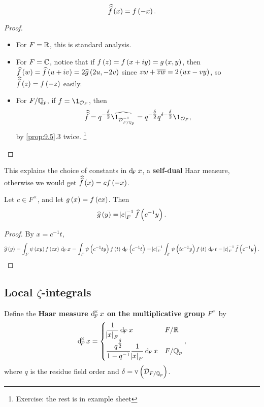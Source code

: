 \begin{proposition}
$$ \hathat{f}\br{x} = f\br{-x}. $$
\end{proposition}

\begin{proof}
\hfill
\begin{itemize}
\item For $ F = \mathbb{R} $, this is standard analysis.
\item For $ F = \mathbb{C} $, notice that if $ f\br{z} = f\br{x + iy} = g\br{x, y} $, then $ \widehat{f}\br{w} = \widehat{f}\br{u + iv} = 2\widehat{g}\br{2u, -2v} $ since $ zw + \overline{zw} = 2\br{ux - vy} $, so $ \hathat{f}\br{z} = f\br{-z} $ easily.
\item For $ F / \mathbb{Q}_p $, if $ f = \1_{\OOO_F} $, then
$$ \hathat{f} = q^{-\tfrac{\delta}{2}}\widehat{\1_{\DDD_{F / \QQ_p}^{-1}}} = q^{-\tfrac{\delta}{2}}q^{\delta - \tfrac{\delta}{2}}\1_{\OOO_F}, $$
by \ref{prop:9.5}.$ 3 $ twice. \footnote{Exercise: the rest is in example sheet}
\end{itemize}
\end{proof}

This explains the choice of constants in $ \dF x $, a \textbf{self-dual} Haar measure, otherwise we would get $ \hathat{f}\br{x} = cf\br{-x} $.

\begin{lemma}
\label{lem:9.7}
Let $ c \in F^\times $, and let $ g\br{x} = f\br{cx} $. Then
$$ \widehat{g}\br{y} = \abs{c}_F^{-1}\widehat{f}\br{c^{-1}y}. $$
\end{lemma}

\begin{proof}
By $ x = c^{-1}t $,
$$ \widehat{g}\br{y} = \intF{\psi\br{xy}f\br{cx}}{x} = \intF{\psi\br{c^{-1}ty}f\br{t}}{\br{c^{-1}t}} = \abs{c}_F^{-1}\intF{\psi\br{tc^{-1}y}f\br{t}}{t} = \abs{c}_F^{-1}\widehat{f}\br{c^{-1}y}. $$
\end{proof}

\pagebreak

\subsection{Local \texorpdfstring{$ \zeta $}{zeta}-integrals}


\begin{definition*}
Define the \textbf{Haar measure $ \dF^\times x $ on the multiplicative group $ F^\times $} by
$$ \dF^\times x =
\begin{cases}
\dfrac{1}{\abs{x}_F}\dF x & F / \RR \\
\dfrac{q^{\tfrac{\delta}{2}}}{1 - q^{-1}}\dfrac{1}{\abs{x}_F}\dF x & F / \QQ_p
\end{cases},
$$
where $ q $ is the residue field order and $ \delta = \v\br{\DDD_{F / \QQ_p}} $.
\end{definition*}

